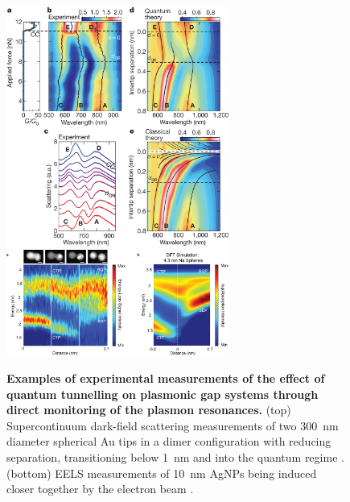 \documentclass{article}
\begin{document}


\begin{figure}[bt]
\centering
\includegraphics[width=0.65\textwidth, clip=true, trim=0 500 0 0]{figures/literature/nature11653-f2_2}\\
\includegraphics[width=0.65\textwidth]{figures/literature/nl-2012-04078v_0001}
\caption[Examples of experimental measurements of the effect of quantum tunnelling on plasmonic gap systems]{\textbf{Examples of experimental measurements of the effect of quantum tunnelling on plasmonic gap systems through direct monitoring of the plasmon resonances.} (top) Supercontinuum dark-field scattering measurements of two \SI{300}{nm} diameter spherical Au tips in a dimer configuration with reducing separation, transitioning below \SI{1}{nm} and into the quantum regime \cite{savage2012}. (bottom) EELS measurements of \SI{10}{nm} AgNPs being induced closer together by the electron beam \cite{scholl2013}.}
\label{fig:tunnelling_plasmonics}
\end{figure}
\end{document}
